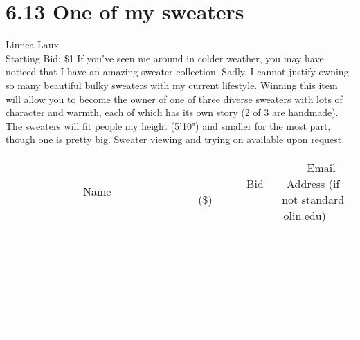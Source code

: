 \documentclass[11pt]{article}
\begin{document}
\section*{6.13 One of my sweaters}
Linnea Laux
\\
Starting Bid: \$1
\newline
If you've seen me around in colder weather, you may have noticed that I have an amazing sweater collection. Sadly, I cannot justify owning so many beautiful bulky sweaters with my current lifestyle. Winning this item will allow you to become the owner of one of three diverse sweaters with lots of character and warmth, each of which has its own story (2 of 3 are handmade). The sweaters will fit people my height (5'10") and smaller for the most part, though one is pretty big. Sweater viewing and trying on available upon request.
\\[6ex]
\begin{tabular}{c c c}
~~~~~~~~~~~~~Name~~~~~~~~~~~~~ & ~~~~~~~~~Bid (\$)~~~~~~~~~  & ~~~Email Address (if not standard olin.edu)~~~\\
 & & \\
\hline
 & & \\
\hline
 & & \\
\hline
 & & \\
\hline
 & & \\
\hline
 & & \\
\hline
 & & \\
\hline
 & & \\
\hline
 & & \\
\hline
 & & \\
\hline
 & & \\
\hline
 & & \\
\hline
 & & \\
\hline
 & & \\
\hline
 & & \\
\hline
 & & \\
\hline
 & & \\
\hline
 & & \\
\hline
 & & \\
\hline
 & & \\
\hline
 & & \\
\hline
 & & \\
\hline
 & & \\
\hline
 & & \\
\hline
 & & \\
\hline
 & & \\
\hline
\end{tabular}
\newpage
\end{document}
